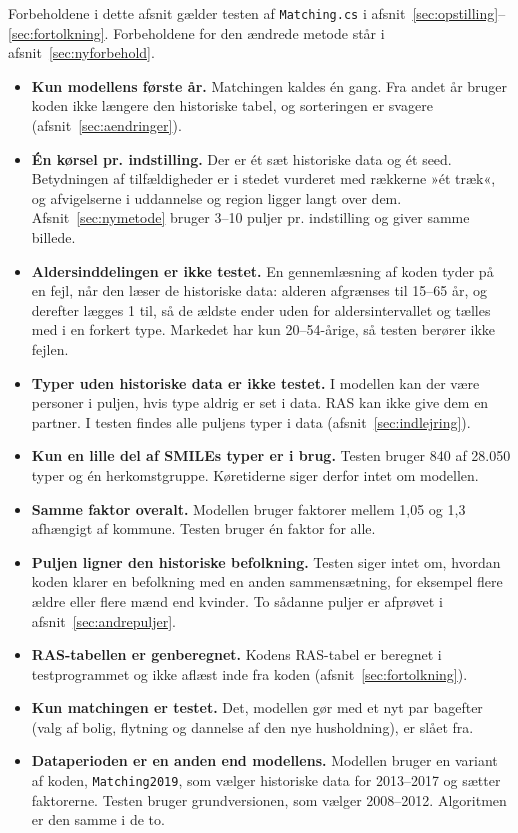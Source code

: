 \documentclass[11pt,a4paper]{article}
\newcommand{\kode}[1]{\texttt{#1}}
\begin{document}
Forbeholdene i dette afsnit gælder testen af \kode{Matching.cs} i
afsnit~\ref{sec:opstilling}--\ref{sec:fortolkning}. Forbeholdene for den ændrede metode står i
afsnit~\ref{sec:nyforbehold}.

\begin{itemize}
\item \textbf{Kun modellens første år.} Matchingen kaldes én gang. Fra andet år bruger koden ikke
længere den historiske tabel, og sorteringen er svagere (afsnit~\ref{sec:aendringer}).
\item \textbf{Én kørsel pr. indstilling.} Der er ét sæt historiske data og ét seed. Betydningen af
tilfældigheder er i stedet vurderet med rækkerne »ét træk«, og afvigelserne i uddannelse og region
ligger langt over dem. Afsnit~\ref{sec:nymetode} bruger 3--10 puljer pr. indstilling og giver
samme billede.
\item \textbf{Aldersinddelingen er ikke testet.} En gennemlæsning af koden tyder på en fejl, når den
læser de historiske data: alderen afgrænses til 15--65 år, og derefter lægges 1 til, så de ældste
ender uden for aldersintervallet og tælles med i en forkert type. Markedet har kun 20--54-årige, så
testen berører ikke fejlen.
\item \textbf{Typer uden historiske data er ikke testet.} I modellen kan der være personer i puljen,
hvis type aldrig er set i data. RAS kan ikke give dem en partner. I testen findes alle puljens typer
i data (afsnit~\ref{sec:indlejring}).
\item \textbf{Kun en lille del af SMILEs typer er i brug.} Testen bruger 840 af 28.050 typer og én
herkomstgruppe. Køretiderne siger derfor intet om modellen.
\item \textbf{Samme faktor overalt.} Modellen bruger faktorer mellem 1,05 og 1,3 afhængigt af
kommune. Testen bruger én faktor for alle.
\item \textbf{Puljen ligner den historiske befolkning.} Testen siger intet om, hvordan koden klarer en
befolkning med en anden sammensætning, for eksempel flere ældre eller flere mænd end kvinder. To
sådanne puljer er afprøvet i afsnit~\ref{sec:andrepuljer}.
\item \textbf{RAS-tabellen er genberegnet.} Kodens RAS-tabel er beregnet i testprogrammet og ikke
aflæst inde fra koden (afsnit~\ref{sec:fortolkning}).
\item \textbf{Kun matchingen er testet.} Det, modellen gør med et nyt par bagefter (valg af bolig,
flytning og dannelse af den nye husholdning), er slået fra.
\item \textbf{Dataperioden er en anden end modellens.} Modellen bruger en variant af koden,
\kode{Matching2019}, som vælger historiske data for 2013--2017 og sætter faktorerne. Testen bruger
grundversionen, som vælger 2008--2012. Algoritmen er den samme i de to.
\end{itemize}
\end{document}
